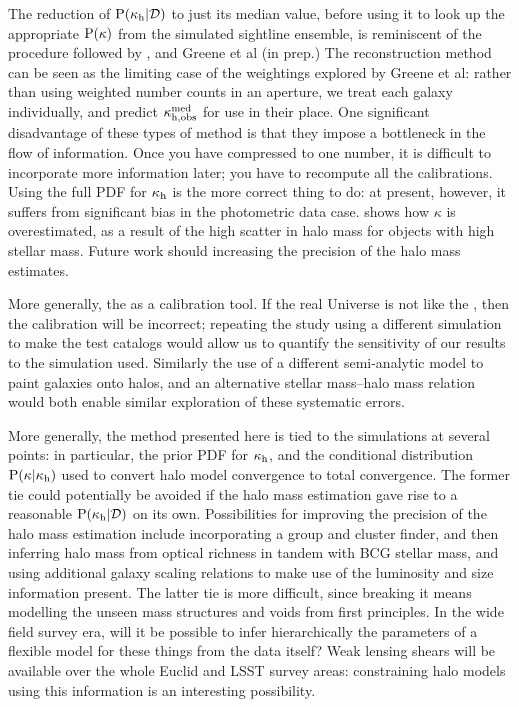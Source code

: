 \documentclass[useAMS,usenatbib]{mn2e}
\begin{document}
The reduction of ${\rm P}(\kappa_{\rm h}|{\mathcal{D}})$ to just its median value, before using
it to look up the appropriate ${\rm P}(\kappa)$ from the simulated sightline
ensemble, is reminiscent of the procedure followed by \citet{SuyuEtal2010},
and Greene et al (in prep.) The reconstruction method can be seen as the
limiting case of the weightings explored by Greene et al: rather than using
weighted number counts in an aperture, we treat each galaxy individually, and
predict  $\kappa_{\rm h,obs}^{\rm med}$ for use in their place. One
significant disadvantage of these types of method is that they impose a
bottleneck in the flow of information. Once you have compressed to one number,
it is difficult to incorporate more information later; you have to recompute
all the calibrations. Using the full PDF for $\kappa_{\rm h}$ is the more correct
thing to do: at present, however, it suffers from significant bias in the
photometric data case.  shows how $\kappa$ is
overestimated, as a result of the high scatter in halo mass for objects with 
high stellar mass. Future work should increasing the precision of the halo
mass estimates. 

More generally, the \MS as a calibration tool. If the real Universe is not
like the \MS, then the calibration will be incorrect; repeating the study using
a different simulation to make the test catalogs would allow us to quantify
the sensitivity of our results to the simulation used. Similarly the use of a
different semi-analytic model to paint galaxies onto halos, and an alternative
stellar mass--halo mass relation would both enable similar exploration of
these systematic errors.

More generally, the method presented here is tied to the simulations at
several points: in particular, the prior PDF for $\kappa_{\rm h}$, and the
conditional distribution ${\rm P}(\kappa|\kappa_{\rm h})$ used to convert halo model
convergence to total convergence. The former tie could potentially be avoided
if the halo mass estimation gave rise to a reasonable ${\rm P}(\kappa_{\rm h}|{\mathcal{D}})$ on
its own. Possibilities for improving the precision of the halo mass estimation
include incorporating a group and cluster finder, and then inferring halo mass
from optical richness \citep[\eg][]{MaxBCG} in tandem with BCG stellar mass,
and using additional galaxy scaling relations to make use of the luminosity
and size information present. The latter tie is more difficult, since breaking
it means modelling the unseen mass structures and voids from first principles.
In the wide field survey era, will it be possible to infer hierarchically the
parameters of a flexible model for these things from the data itself? Weak
lensing shears will be available over the whole Euclid and LSST survey areas:
constraining halo models using this information is an interesting possibility.
\end{document}
